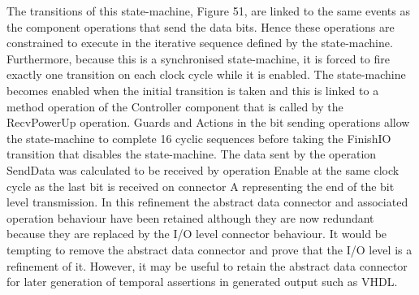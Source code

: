 The transitions of this state-machine, Figure 51, are linked to the same events as the component operations that send the data bits. Hence these operations are constrained to execute in the iterative sequence defined by the state-machine. Furthermore, because this is a synchronised state-machine, it is forced to fire exactly one transition on each clock cycle while it is enabled. The state-machine becomes enabled when the initial transition is taken and this is linked to a method operation of the Controller component that is called by the RecvPowerUp operation. Guards and Actions in the bit sending operations allow the state-machine to complete 16 cyclic sequences before taking the FinishIO transition that disables the state-machine. The data sent by the operation SendData was calculated to be received by operation Enable at the same clock cycle as the last bit is received on connector A representing the end of the bit level transmission.
In this refinement the abstract data connector and associated operation behaviour have been retained although they are now redundant because they are replaced by the I/O level connector behaviour. It would be tempting to remove the abstract data connector and prove that the I/O level is a refinement of it. However, it may be useful to retain the abstract data connector for later generation of temporal assertions in generated output such as VHDL.

